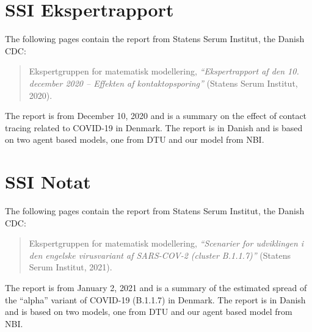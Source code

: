 
\chapter{SSI Ekspertrapport}
\label{appendix:ssi-report}

The following pages contain the report from Statens Serum Institut, the Danish CDC:
\begin{quote}
    Ekspertgruppen for matematisk modellering, \emph{``Ekspertrapport af den 10. december 2020 -- Effekten af kontaktopsporing''} (Statens Serum Institut, 2020).
\end{quote}
The report is from December 10, 2020 and is a summary on the effect of contact tracing related to COVID-19 in Denmark. The report is in Danish and is based on two agent based models, one from DTU and our model from NBI.

\clearpage
% 




\chapter{SSI Notat}
\label{appendix:ssi-notat}

The following pages contain the report from Statens Serum Institut, the Danish CDC:
\begin{quote}
    Ekspertgruppen for matematisk modellering, \emph{``Scenarier for udviklingen i den engelske virusvariant af SARS-COV-2 (cluster B.1.1.7)''} (Statens Serum Institut, 2021).
\end{quote}
The report is from January 2, 2021 and is a summary of the estimated spread of the ``alpha'' variant of COVID-19 (B.1.1.7) in Denmark. The report is in Danish and is based on two models, one from DTU and our agent based model from NBI.

\clearpage



